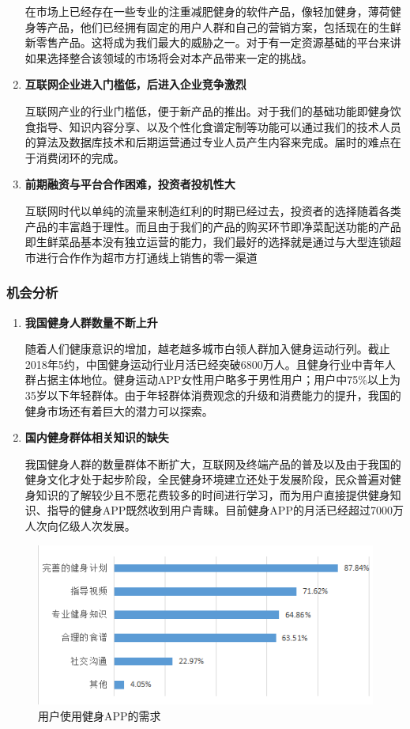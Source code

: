 \documentclass[UTF8,12pt]{ctexart}
\numberwithin{figure}{section}%
\begin{document}
\begin{spacing}{2}
\begin{enumerate}
	在市场上已经存在一些专业的注重减肥健身的软件产品，像轻加健身，薄荷健身等产品，他们已经拥有固定的用户人群和自己的营销方案，包括现在的生鲜新零售产品。这将成为我们最大的威胁之一。对于有一定资源基础的平台来讲如果选择整合该领域的市场将会对本产品带来一定的挑战。
	\item[(2)] \textbf{互联网企业进入门槛低，后进入企业竞争激烈 }
	
	互联网产业的行业门槛低，便于新产品的推出。对于我们的基础功能即健身饮食指导、知识内容分享、以及个性化食谱定制等功能可以通过我们的技术人员的算法及数据库技术和后期运营通过专业人员产生内容来完成。届时的难点在于消费闭环的完成。	
	\item[(3)] \textbf{前期融资与平台合作困难，投资者投机性大 }	
	
	互联网时代以单纯的流量来制造红利的时期已经过去，投资者的选择随着各类产品的丰富趋于理性。而且由于我们的产品的购买环节即净菜配送功能的产品即生鲜菜品基本没有独立运营的能力，我们最好的选择就是通过与大型连锁超市进行合作作为超市方打通线上销售的零一渠道
\end{enumerate}

\subsubsection{机会分析}
\begin{enumerate}
	\item[(1)] \textbf{我国健身人群数量不断上升 }
	
	\setlength{\parindent}{2em}随着人们健康意识的增加，越老越多城市白领人群加入健身运动行列。截止2018年5约，中国健身运动行业月活已经突破6800万人。且健身行业中青年人群占据主体地位。健身运动APP女性用户略多于男性用户；用户中75\%以上为35岁以下年轻群体。由于年轻群体消费观念的升级和消费能力的提升，我国的健身市场还有着巨大的潜力可以探索。
	
	
	\item[(2)] \textbf{国内健身群体相关知识的缺失 }	
	
	\setlength{\parindent}{2em}我国健身人群的数量群体不断扩大，互联网及终端产品的普及以及由于我国的健身文化才处于起步阶段，全民健身环境建立还处于发展阶段，民众普遍对健身知识的了解较少且不愿花费较多的时间进行学习，而为用户直接提供健身知识、指导的健身APP既然收到用户青睐。目前健身APP的月活已经超过7000万人次向亿级人次发展。

\end{enumerate}

\begin{figure}[!htb]
	\centering
	\includegraphics[width=12cm]{fig/7}
	\caption{用户使用健身APP的需求}
\end{figure}


\end{spacing}
\end{document}
